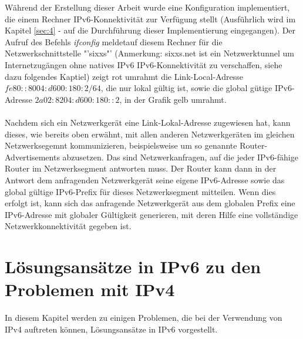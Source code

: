 \documentclass[a4paper,12pt]{scrartcl}
\begin{document}
Während der Erstellung dieser Arbeit wurde eine Konfiguration implementiert, die einem Rechner IPv6-Konnektivität zur Verfügung stellt (Ausführlich wird im Kapitel \ref{sec:4} -  auf die Durchführung dieser Implementierung eingegangen). Der Aufruf des Befehls \textit{ifconfig} meldetauf diesem Rechner  f\"ur die Netzwerkschnittstelle "'sixxs"' (Anmerkung: sixxs.net ist ein Netzwerktunnel um Internetzug\"angen ohne natives IPv6 IPv6-Konnektivit\"at zu verschaffen, siehe dazu folgendes Kaptiel) zeigt rot umrahmt die Link-Local-Adresse $fe80::8004:d600:180:2/64$, die nur lokal g\"ultig ist, sowie die global g\"utige IPv6-Adresse $2a02:8204:d600:180::2$, in der Grafik gelb umrahmt.\\
\\
Nachdem sich ein Netzwerkger\"at eine Link-Lokal-Adresse zugewiesen hat, kann dieses, wie bereits oben erw\"ahnt, mit allen anderen Netzwerkger\"aten im gleichen Netzwerksegemnt kommunizieren, beispielsweise um so genannte Router-Advertisements abzusetzen. Das sind Netzwerkanfragen, auf die jeder IPv6-f\"ahige Router im Netzwerksegment antworten muss. Der Router kann dann in der Antwort dem anfragenden Netzwerkger\"at seine eigene IPv6-Adresse sowie das global g\"ultige IPv6-Prefix f\"ur dieses Netzwerksegment mitteilen. Wenn dies erfolgt ist, kann sich das anfragende Netzwerkger\"at aus dem globalen Prefix eine IPv6-Adresse mit globaler G\"ultigkeit generieren, mit deren Hilfe eine vollst\"andige Netzwerkkonnektivit\"at gegeben ist. 


\clearpage
\section{L\"osungsans\"atze in IPv6 zu den Problemen mit IPv4}
\label{sec:3}
In diesem Kapitel werden zu einigen Problemen, die bei der Verwendung von IPv4 auftreten können, Lösungsansätze in IPv6 vorgestellt.
 
\end{document}
